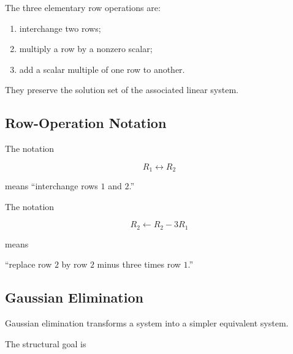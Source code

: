 The three elementary row operations are:

\begin{enumerate}
    \item interchange two rows;
    \item multiply a row by a nonzero scalar;
    \item add a scalar multiple of one row to another.
\end{enumerate}

They preserve the solution set of the associated linear system.

\subsection{Row-Operation Notation}
\label{subsec:row-operation-notation}

The notation

\[ R_1\leftrightarrow R_2 \]

means ``interchange rows \(1\) and \(2\).''

The notation

\[ R_2\leftarrow R_2-3R_1 \]

means

\begin{center}
``replace row \(2\) by row \(2\) minus three times row \(1\).''
\end{center}

\subsection{Gaussian Elimination}
\label{subsec:gaussian-elimination}

Gaussian elimination transforms a system into a simpler equivalent system.

The structural goal is

\begin{center}
\end{center}

